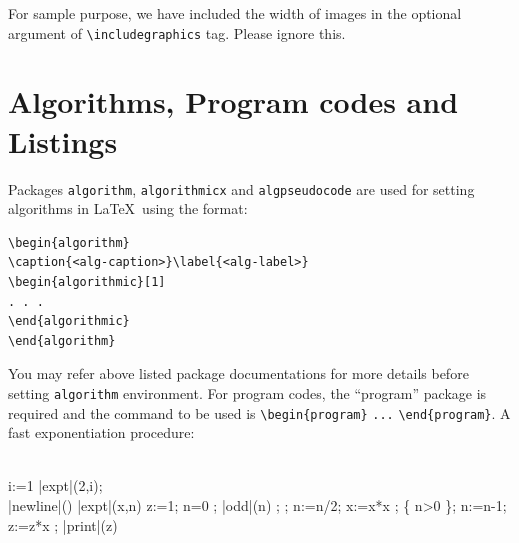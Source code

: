 \documentclass[default,pdflatex,iicol]{sn-jnl}%
\begin{document}
For sample purpose, we have included the width of images in the optional argument of \verb+\includegraphics+ tag. Please ignore this. 

\section{Algorithms, Program codes and Listings}\label{sec7}

Packages \verb+algorithm+, \verb+algorithmicx+ and \verb+algpseudocode+ are used for setting algorithms in \LaTeX\ using the format:

\bigskip
\begin{verbatim}
\begin{algorithm}
\caption{<alg-caption>}\label{<alg-label>}
\begin{algorithmic}[1]
. . .
\end{algorithmic}
\end{algorithm}
\end{verbatim}
\bigskip

You may refer above listed package documentations for more details before setting \verb+algorithm+ environment. For program codes, the ``program'' package is required and the command to be used is \verb+\begin{program}+ \verb+...+ \verb+\end{program}+. A fast exponentiation procedure:

\begin{program}
\BEGIN \\ %
  \FOR i:=1   \DO
     |expt|(2,i); \\ |newline|() \OD %
\WHERE
\PROC |expt|(x,n) \BODY
          z:=1;
          \DO \IF n=0 \THEN \EXIT \FI;
             \DO \IF |odd|(n) \THEN \EXIT \FI;
;
                n:=n/2; x:=x*x \OD;
             \{ n>0 \};
             n:=n-1; z:=z*x \OD;
          |print|(z) \ENDPROC
\END
\end{program}
\end{document}
